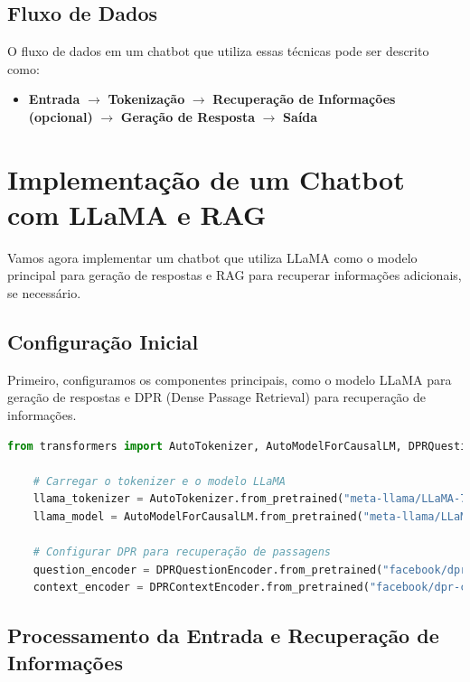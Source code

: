 \documentclass[14pt,a4paper,oneside]{book}
\begin{document}
\subsection{Fluxo de Dados}

O fluxo de dados em um chatbot que utiliza essas técnicas pode ser descrito como:

\begin{itemize}
	\item \textbf{Entrada} $\rightarrow$ \textbf{Tokenização} $\rightarrow$ \textbf{Recuperação de Informações (opcional)} $\rightarrow$ \textbf{Geração de Resposta} $\rightarrow$ \textbf{Saída}
\end{itemize}

\section{Implementação de um Chatbot com LLaMA e RAG}

Vamos agora implementar um chatbot que utiliza LLaMA como o modelo principal para geração de respostas e RAG para recuperar informações adicionais, se necessário.

\subsection{Configuração Inicial}

Primeiro, configuramos os componentes principais, como o modelo LLaMA para geração de respostas e DPR (Dense Passage Retrieval) para recuperação de informações.

\begin{lstlisting}[language=Python]
	from transformers import AutoTokenizer, AutoModelForCausalLM, DPRQuestionEncoder, DPRContextEncoder
	
	# Carregar o tokenizer e o modelo LLaMA
	llama_tokenizer = AutoTokenizer.from_pretrained("meta-llama/LLaMA-7B")
	llama_model = AutoModelForCausalLM.from_pretrained("meta-llama/LLaMA-7B")
	
	# Configurar DPR para recuperação de passagens
	question_encoder = DPRQuestionEncoder.from_pretrained("facebook/dpr-question_encoder-single-nq-base")
	context_encoder = DPRContextEncoder.from_pretrained("facebook/dpr-ctx_encoder-single-nq-base")
\end{lstlisting}

\subsection{Processamento da Entrada e Recuperação de Informações}
\end{document}
